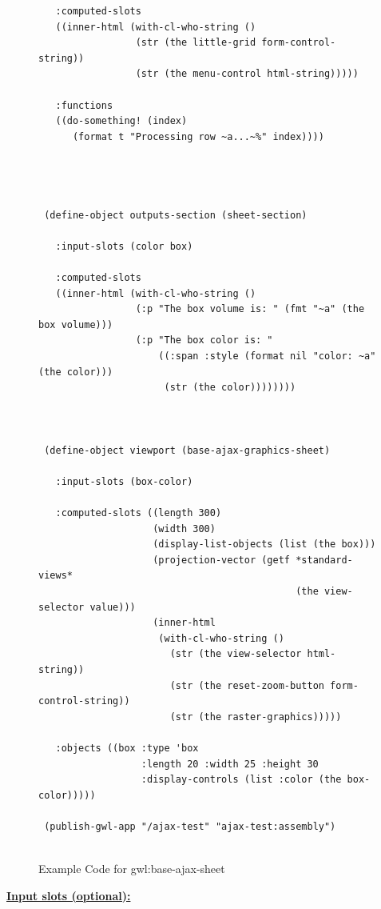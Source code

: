 \documentclass [11pt]{book}
\begin{document}
\begin{itemize}
\begin{figure}
\begin{lrbox}{\boxedverb}
\begin{minipage}{\linewidth}
{\begin{verbatim}
   :computed-slots 
   ((inner-html (with-cl-who-string ()
                 (str (the little-grid form-control-string))
                 (str (the menu-control html-string)))))
   
   :functions
   ((do-something! (index)
      (format t "Processing row ~a...~%" index))))




 (define-object outputs-section (sheet-section)
   
   :input-slots (color box)
  
   :computed-slots 
   ((inner-html (with-cl-who-string ()
                 (:p "The box volume is: " (fmt "~a" (the box volume)))
                 (:p "The box color is: " 
                     ((:span :style (format nil "color: ~a" (the color)))
                      (str (the color))))))))



 (define-object viewport (base-ajax-graphics-sheet)
  
   :input-slots (box-color)

   :computed-slots ((length 300)
                    (width 300)
                    (display-list-objects (list (the box)))
                    (projection-vector (getf *standard-views* 
                                             (the view-selector value)))
                    (inner-html
                     (with-cl-who-string ()
                       (str (the view-selector html-string))
                       (str (the reset-zoom-button form-control-string))
                       (str (the raster-graphics)))))
  
   :objects ((box :type 'box 
                  :length 20 :width 25 :height 30
                  :display-controls (list :color (the box-color)))))
   
 (publish-gwl-app "/ajax-test" "ajax-test:assembly")


\end{verbatim}}
\end{minipage}
\end{lrbox}
\fbox{\usebox{\boxedverb}}

\caption{Example Code for gwl:base-ajax-sheet}

\label{fig:example-code-gwl:base-ajax-sheet}

\end{figure}





\textbf{
\underline{Input slots (optional):}}


\end{itemize}
\end{document}
